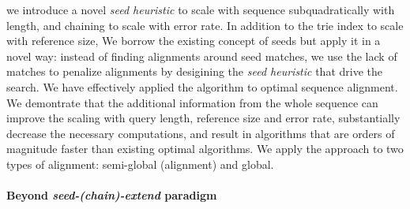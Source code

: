 we introduce a novel
\emph{seed heuristic} to scale with sequence subquadratically with length, and
chaining to scale with error rate.
In addition to the trie index to scale with reference size, 
%
We borrow the existing concept of seeds but apply it in a novel way: instead of
finding alignments around seed matches, we use the lack of matches to penalize
alignments by desigining the \emph{seed heuristic} that drive the \A search.
%
We have effectively applied the \A algorithm to optimal sequence alignment. We
demontrate that the additional information from the whole sequence can improve
the scaling with query length, reference size and error rate, substantially
decrease the necessary computations, and result in algorithms that are orders of
magnitude faster than existing optimal algorithms. We apply the \A approach to
two types of alignment: semi-global (alignment) and global.

\paragraph{Beyond \emph{seed-(chain)-extend} paradigm}

